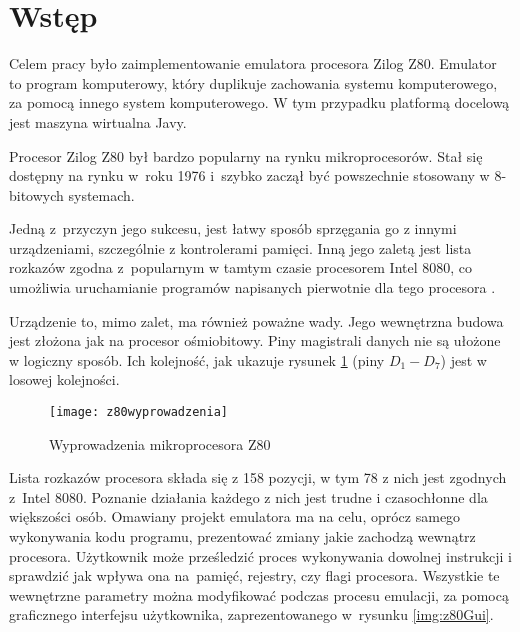 \chapter*{Wstęp}
    
    
    Celem pracy było zaimplementowanie emulatora procesora Zilog Z80. Emulator to program komputerowy, który duplikuje zachowania systemu komputerowego, za pomocą innego system komputerowego. \cite{studyofthetechniquesforemulationprogramming}
    W tym przypadku platformą docelową jest maszyna wirtualna Javy.
    
	Procesor Zilog Z80 był bardzo popularny na rynku mikroprocesorów\cite{karczmarczuk}. 
	Stał się dostępny na rynku w~roku 1976 i~szybko zaczął być powszechnie stosowany w 8-bitowych systemach.
	
	Jedną z~przyczyn jego sukcesu, jest łatwy sposób sprzęgania go z innymi urządzeniami, szczególnie z kontrolerami pamięci. Inną jego zaletą jest lista rozkazów zgodna z~popularnym w tamtym czasie procesorem Intel 8080, co umożliwia uruchamianie programów napisanych pierwotnie dla tego procesora \cite{karczmarczuk}.
	
	Urządzenie to, mimo zalet, ma również poważne wady. Jego wewnętrzna budowa jest złożona jak na procesor ośmiobitowy. Piny magistrali danych nie są ułożone w logiczny sposób. Ich kolejność, jak ukazuje rysunek \ref{img:z80wyprowadzenia} (piny $D_{1} - D_{7} $) jest w losowej kolejności.
    
	\begin{figure}[h]
		\centering
		\texttt{[image: z80wyprowadzenia]}
		\caption{Wyprowadzenia mikroprocesora Z80 \cite{karczmarczuk}}
		\label{img:z80wyprowadzenia}
	\end{figure}
			
	
	\newpage
	Lista rozkazów procesora składa się z 158 pozycji, w tym 78 z nich jest zgodnych z~Intel 8080\cite{manual}. Poznanie działania każdego z nich jest trudne i czasochłonne dla większości osób. Omawiany projekt emulatora ma na celu, oprócz samego wykonywania kodu programu, prezentować zmiany jakie zachodzą wewnątrz procesora. Użytkownik może prześledzić proces wykonywania dowolnej instrukcji i sprawdzić jak wpływa ona na~pamięć, rejestry, czy flagi procesora. Wszystkie te wewnętrzne parametry można modyfikować podczas procesu emulacji, za pomocą graficznego interfejsu użytkownika, zaprezentowanego w~rysunku \ref{img:z80Gui}.
	
